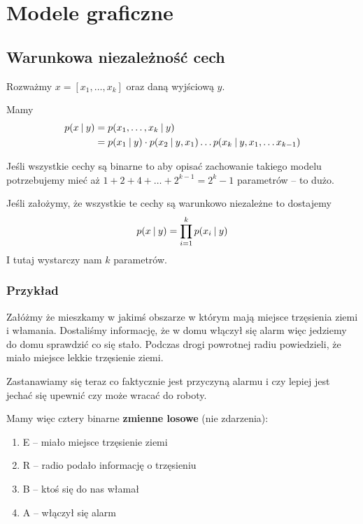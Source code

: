 \chapter{Modele graficzne}

\section{Warunkowa niezależność cech}

Rozważmy \( x = [x_1, \dots, x_k] \) oraz daną wyjściową \( y \).

Mamy
\begin{align*}
	p(x \:\vert\: y)
	 & = p(x_1, \dots, x_k \:\vert\: y)                                                          \\
	 & = p(x_1 \:\vert\: y) \cdot p(x_2 \:\vert\: y, x_1) \dots p(x_k \:\vert\: y, x_1, \dots x_{k-1})
\end{align*}

Jeśli wszystkie cechy są binarne to aby opisać zachowanie takiego modelu potrzebujemy mieć aż
\( 1 + 2 + 4 + \dots + 2^{k-1} = 2^k - 1 \) parametrów -- to dużo.

Jeśli założymy, że wszystkie te cechy są warunkowo niezależne to dostajemy
\[
	p(x \:\vert\: y) = \prod_{i=1}^k p(x_i \:\vert\: y)
\]
I tutaj wystarczy nam \( k \) parametrów.

\subsection{Przykład}

Załóżmy że mieszkamy w jakimś obszarze w którym mają miejsce trzęsienia ziemi i włamania. Dostaliśmy informację, że w domu włączył się alarm więc jedziemy do domu sprawdzić co się stało.
Podczas drogi powrotnej radiu powiedzieli, że miało miejsce lekkie trzęsienie ziemi.

Zastanawiamy się teraz co faktycznie jest przyczyną alarmu i czy lepiej jest jechać się upewnić czy może wracać do roboty.

Mamy więc cztery binarne \textbf{zmienne losowe} (nie zdarzenia):
\begin{enumerate}
	\item E -- miało miejsce trzęsienie ziemi
	\item R -- radio podało informację o trzęsieniu
	\item B -- ktoś się do nas włamał
	\item A -- włączył się alarm
\end{enumerate}

